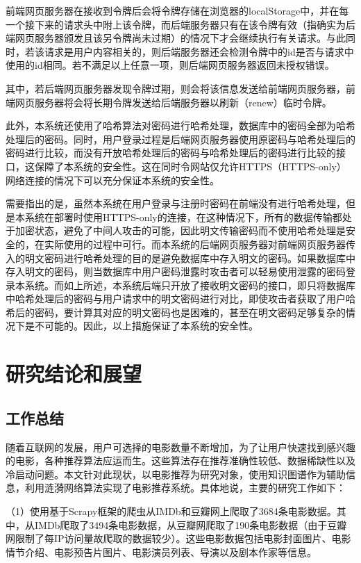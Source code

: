 \documentclass{bjfuthesis}
\begin{document}
前端网页服务器在接收到令牌后会将令牌存储在浏览器的localStorage中，并在每一个接下来的请求头中附上该令牌，而后端服务器只有在该令牌有效（指确实为后端网页服务器颁发且该另令牌尚未过期）的情况下才会继续执行有关请求。与此同时，若该请求是用户内容相关的，则后端服务器还会检测令牌中的id是否与请求中使用的id相同。若不满足以上任意一项，则后端网页服务器返回未授权错误。

其中，若后端网页服务器发现令牌过期，则会将该信息发送给前端网页服务器，前端网页服务器将会将长期令牌发送给后端服务器以刷新（renew）临时令牌。

此外，本系统还使用了哈希算法对密码进行哈希处理，数据库中的密码全部为哈希处理后的密码。同时，用户登录过程是后端网页服务器使用原密码与哈希处理后的密码进行比较，而没有开放哈希处理后的密码与哈希处理后的密码进行比较的接口，这保障了本系统的安全性。这在同时令网站仅允许HTTPS（HTTPS-only）网络连接的情况下可以充分保证本系统的安全性。

需要指出的是，虽然本系统在用户登录与注册时密码在前端没有进行哈希处理，但是本系统在部署时使用HTTPS-only的连接，在这种情况下，所有的数据传输都处于加密状态，避免了中间人攻击的可能，因此明文传输密码而不使用哈希处理是安全的，在实际使用的过程中可行。而本系统的后端网页服务器对前端网页服务器传入的明文密码进行哈希处理的目的是避免数据库中存入明文的密码。如果数据库中存入明文的密码，则当数据库中用户密码泄露时攻击者可以轻易使用泄露的密码登录本系统。而如上所述，本系统后端只开放了接收明文密码的接口，即只将数据库中哈希处理后的密码与用户请求中的明文密码进行对比，即使攻击者获取了用户哈希后的密码，要计算其对应的明文密码也是困难的，甚至在明文密码足够复杂的情况下是不可能的。因此，以上措施保证了本系统的安全性。
\chapter{研究结论和展望}
\section{工作总结}
随着互联网的发展，用户可选择的电影数量不断增加，为了让用户快速找到感兴趣的电影，各种推荐算法应运而生。这些算法存在推荐准确性较低、数据稀缺性以及冷启动问题。本文针对此现状，以电影推荐为研究对象，使用知识图谱作为辅助信息，利用涟漪网络算法实现了电影推荐系统。具体地说，主要的研究工作如下：

（1）使用基于Scrapy框架的爬虫从IMDb和豆瓣网上爬取了3684条电影数据。其中，从IMDb爬取了3494条电影数据，从豆瓣网爬取了190条电影数据（由于豆瓣网限制了每IP访问量故爬取的数据较少）。这些电影数据包括电影封面图片、电影情节介绍、电影预告片图片、电影演员列表、导演以及剧本作家等信息。
\end{document}
